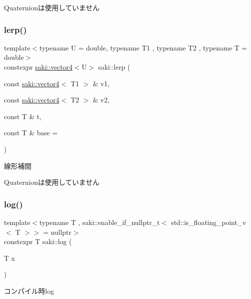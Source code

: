Quaternionは使用していません \mbox{\label{namespacesaki_acc3cd6d8e07cbfcd2691c4d9ffe25416}} 
\subsubsection{\texorpdfstring{lerp()}{lerp()}\hspace{0.1cm}{\footnotesize\ttfamily [3/3]}}
{\footnotesize\ttfamily template$<$typename U  = double, typename T1 , typename T2 , typename T  = double$>$ \\
constexpr \mbox{\hyperlink{classsaki_1_1vector4}{saki\+::vector4}}$<$U$>$ saki\+::lerp (\begin{DoxyParamCaption}\item[{const \mbox{\hyperlink{classsaki_1_1vector4}{saki\+::vector4}}$<$ T1 $>$ \&}]{v1,  }\item[{const \mbox{\hyperlink{classsaki_1_1vector4}{saki\+::vector4}}$<$ T2 $>$ \&}]{v2,  }\item[{const T \&}]{t,  }\item[{const T \&}]{base = {} }\end{DoxyParamCaption})}



線形補間 

Quaternionは使用していません \mbox{\label{namespacesaki_a64136b916afd50ceb9bfb93ae12c63fb}} 
\subsubsection{\texorpdfstring{log()}{log()}\hspace{0.1cm}{\footnotesize\ttfamily [1/2]}}
{\footnotesize\ttfamily template$<$typename T , saki\+::enable\+\_\+if\+\_\+nullptr\+\_\+t$<$ std\+::is\+\_\+floating\+\_\+point\+\_\+v$<$ T $>$$>$  = nullptr$>$ \\
constexpr T saki\+::log (\begin{DoxyParamCaption}\item[{T}]{x }\end{DoxyParamCaption})}



コンパイル時log 

\mbox{\label{namespacesaki_a7f260fd4311e2bd21ae770f8aed6fa81}} 
